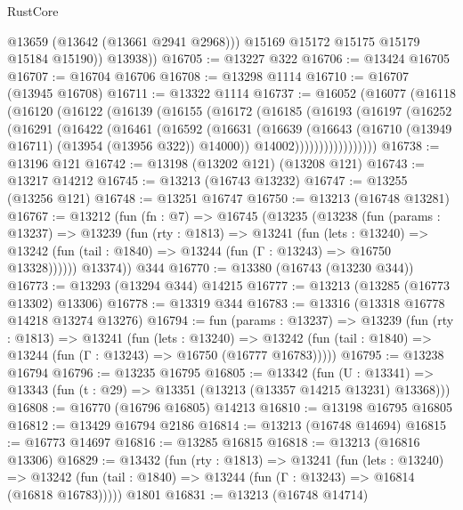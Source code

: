 \begin{lexlean}{RustCore}
\begin{coremodule}
              @13659
              (@13642 (@13661 @2941 @2968)))
            @15169
            @15172
            @15175
            @15179
            @15184
            @15190))
        @13938))
@16705 := @13227 @322
@16706 := @13424 @16705
@16707 := @16704 @16706
@16708 := @13298 @1114
@16710 := @16707 (@13945 @16708)
@16711 := @13322 @1114
@16737 := @16052
    (@16077
      (@16118
        (@16120
          (@16122
            (@16139
              (@16155
                (@16172
                  (@16185
                    (@16193
                      (@16197
                        (@16252
                          (@16291
                            (@16422
                              (@16461
                                (@16592
                                  (@16631
                                    (@16639
                                      (@16643
                                        (@16710 (@13949 @16711) (@13954 (@13956 @322)) @14000))
                                      @14002)))))))))))))))))
@16738 := @13196 @121
@16742 := @13198 (@13202 @121) (@13208 @121)
@16743 := @13217 @14212
@16745 := @13213 (@16743 @13232)
@16747 := @13255 (@13256 @121)
@16748 := @13251 @16747
@16750 := @13213 (@16748 @13281)
@16767 := @13212
    (fun (fn : @7) =>
    @16745
      (@13235
        (@13238
          (fun (params : @13237) =>
          @13239
            (fun (rty : @1813) =>
            @13241
              (fun (lets : @13240) =>
              @13242 (fun (tail : @1840) => @13244 (fun (Γ : @13243) => @16750 @13328))))))
        @13374))
    @344
@16770 := @13380 (@16743 (@13230 @344))
@16773 := @13293 (@13294 @344) @14215
@16777 := @13213 (@13285 (@16773 @13302) @13306)
@16778 := @13319 @344
@16783 := @13316 (@13318 @16778 @14218 @13274 @13276)
@16794 := fun (params : @13237) =>
  @13239
    (fun (rty : @1813) =>
    @13241
      (fun (lets : @13240) =>
      @13242 (fun (tail : @1840) => @13244 (fun (Γ : @13243) => @16750 (@16777 @16783)))))
@16795 := @13238 @16794
@16796 := @13235 @16795
@16805 := @13342
    (fun (U : @13341) => @13343 (fun (t : @29) => @13351 (@13213 (@13357 @14215 @13231) @13368)))
@16808 := @16770 (@16796 @16805) @14213
@16810 := @13198 @16795 @16805
@16812 := @13429 @16794 @2186
@16814 := @13213 (@16748 @14694)
@16815 := @16773 @14697
@16816 := @13285 @16815
@16818 := @13213 (@16816 @13306)
@16829 := @13432
    (fun (rty : @1813) =>
    @13241
      (fun (lets : @13240) =>
      @13242 (fun (tail : @1840) => @13244 (fun (Γ : @13243) => @16814 (@16818 @16783)))))
    @1801
@16831 := @13213 (@16748 @14714)

\end{coremodule}
\end{lexlean}
